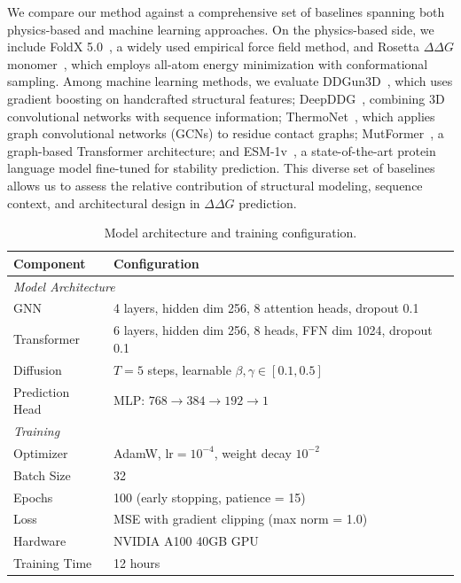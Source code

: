 \documentclass[11pt]{article}
\begin{document}
We compare our method against a comprehensive set of baselines spanning both
physics-based and machine learning approaches. On the physics-based side, we
include FoldX 5.0~\cite{schymkowitz2005foldx}, a widely used empirical force
field method, and Rosetta $\Delta \Delta G$ monomer~\cite{kellogg2011role}, which employs
all-atom energy minimization with conformational sampling. Among machine
learning methods, we evaluate DDGun3D~\cite{montanucci2022ddgun}, which uses
gradient boosting on handcrafted structural features;
DeepDDG~\cite{cao2019deepddg}, combining 3D convolutional networks with
sequence information; ThermoNet~\cite{li2020predicting}, which applies graph
convolutional networks (GCNs) to residue contact graphs;
MutFormer~\cite{zhou2020mutation}, a graph-based Transformer architecture; and
ESM-1v~\cite{meier2021language}, a state-of-the-art protein language model
fine-tuned for stability prediction. This diverse set of baselines allows us to
assess the relative contribution of structural modeling, sequence context, and
architectural design in $\Delta \Delta G$ prediction.












\begin{table}[htbp]
\centering
\caption{Model architecture and training configuration.}
\label{tab:implementation}
\begin{tabular}{ll}
\toprule
\textbf{Component} & \textbf{Configuration} \\
\midrule
\multicolumn{2}{l}{\textit{Model Architecture}} \\
GNN & 4 layers, hidden dim 256, 8 attention heads, dropout 0.1 \\
Transformer & 6 layers, hidden dim 256, 8 heads, FFN dim 1024, dropout 0.1 \\
Diffusion & $T = 5$ steps, learnable $\beta, \gamma \in [0.1, 0.5]$ \\
Prediction Head & MLP: $768 \rightarrow 384 \rightarrow 192 \rightarrow 1$ \\
\midrule
\multicolumn{2}{l}{\textit{Training}} \\
Optimizer & AdamW, $\text{lr} = 10^{-4}$, weight decay $10^{-2}$ \\
Batch Size & 32 \\
Epochs & 100 (early stopping, patience = 15) \\
Loss & MSE with gradient clipping (max norm = 1.0) \\
Hardware & NVIDIA A100 40GB GPU \\
Training Time & 12 hours \\
\bottomrule
\end{tabular}
\end{table}
\end{document}
